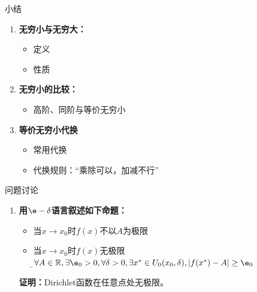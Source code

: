 \begin{frame}[<+->]{小结}
	\linespread{1.5}
	\begin{enumerate}
	  \item {\bf 无穷小与无穷大：}
	  \begin{itemize}
	    \item 定义
	    \item 性质
	  \end{itemize}
	  \item {\bf 无穷小的比较：}
	  \begin{itemize}
	    \item 高阶、同阶与等价无穷小
	  \end{itemize}
	  \item {\bf 等价无穷小代换}
	  \begin{itemize}
	    \item 常用代换
	    \item 代换规则：\alert{“乘除可以，加减不行”}
	  \end{itemize}
	\end{enumerate}
\end{frame}

% 


\begin{frame}{问题讨论}
	\linespread{1.5}\pause 
	\begin{enumerate}
	  \item {\bf 用$\e-\delta$语言叙述如下命题：}\pause 
	  \begin{itemize}
	    \item 当$x\to x_0$时$f(x)$不以$A$为极限\\ \pause 
	    \item 当$x\to x_0$时$f(x)$无极限\pause \\ {\b $\forall
	    A\in\mathbb{R},\exists\e_0>0,\forall\delta>0, \exists x^*\in
	    U_0(x_0,\delta),|f(x^*)-A|\geq\e_0$}\pause 
	  \end{itemize}
	  {\bf 证明：}Dirichlet函数在任意点处无极限。
	\end{enumerate}
\end{frame}

